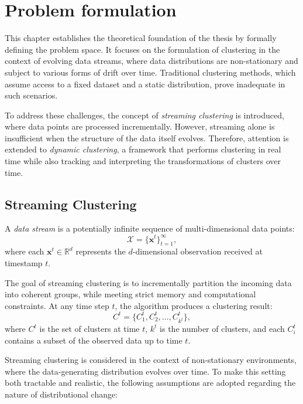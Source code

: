 \chapter{Problem formulation}\label{ch:problem_formulation}

This chapter establishes the theoretical foundation of the thesis by formally
defining the problem space. It focuses on the formulation of clustering in the
context of evolving data streams, where data distributions are non-stationary
and subject to various forms of drift over time. Traditional clustering
methods, which assume access to a fixed dataset and a static distribution,
prove inadequate in such scenarios.

To address these challenges, the concept of \emph{streaming clustering} is
introduced, where data points are processed incrementally. However, streaming
alone is insufficient when the structure of the data itself evolves. Therefore,
attention is extended to \emph{dynamic clustering}, a framework that performs
clustering in real time while also tracking and interpreting the
transformations of clusters over time.

\section{Streaming Clustering}\label{sec:prob_streaming_clustering}

A \emph{data stream} is a potentially infinite sequence of multi-dimensional
data points:
\begin{equation}
    \mathcal{X} = \bigl\{\mathbf{x}^t\bigr\}_{t=1}^{\infty},
\end{equation}
where each $\mathbf{x}^t \in \mathbb{R}^d$ represents the $d$-dimensional observation received at timestamp $t$.

The goal of streaming clustering is to incrementally partition the incoming
data into coherent groups, while meeting strict memory and computational
constraints. At any time step $t$, the algorithm produces a clustering result:
\begin{equation}
    C^t = \{C_1^t, C_2^t, \dots, C_{k^t}^t\},
\end{equation}
where $C^t$ is the set of clusters at time $t$, $k^t$ is the number of clusters, and each $C_i^t$ contains a subset of the observed data up to time $t$.

Streaming clustering is considered in the context of non-stationary
environments, where the data-generating distribution evolves over time. To make
this setting both tractable and realistic, the following assumptions are
adopted regarding the nature of distributional change:

